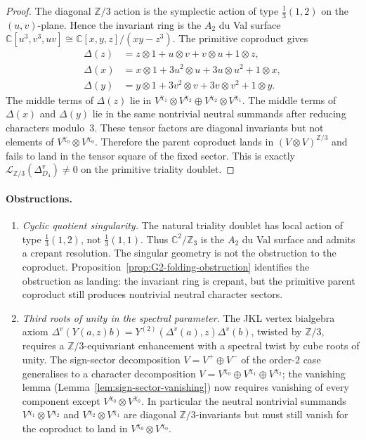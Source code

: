\documentclass[11pt]{amsart}
\theoremstyle{definition}
\theoremstyle{remark}
\begin{document}
\begin{proof}
The diagonal $\mathbb Z/3$ action is the symplectic action of type
$\frac{1}{3}(1,2)$ on the $(u,v)$-plane. Hence the invariant ring is
the $A_2$ du Val surface
$\mathbb C[u^3,v^3,uv]\cong\mathbb C[x,y,z]/(xy-z^3)$.
The primitive coproduct gives
\[
\begin{aligned}
  \Delta(z)
    &= z\otimes 1+u\otimes v+v\otimes u+1\otimes z,\\
  \Delta(x)
    &= x\otimes 1+3u^2\otimes u+3u\otimes u^2+1\otimes x,\\
  \Delta(y)
    &= y\otimes 1+3v^2\otimes v+3v\otimes v^2+1\otimes y .
\end{aligned}
\]
The middle terms of $\Delta(z)$ lie in
$V^{\chi_1}\otimes V^{\chi_2}\oplus
V^{\chi_2}\otimes V^{\chi_1}$. The middle terms of
$\Delta(x)$ and $\Delta(y)$ lie in the same nontrivial neutral
summands after reducing characters modulo~$3$. These tensor factors
are diagonal invariants but not elements of
$V^{\chi_0}\otimes V^{\chi_0}$. Therefore the parent coproduct lands
in $(V\otimes V)^{\mathbb Z/3}$ and fails to land in the tensor square
of the fixed sector. This is exactly
$\mathcal L_{\mathbb Z/3}(\Delta^v_{D_4})\neq 0$ on the primitive
triality doublet.
\end{proof}

\paragraph{Obstructions.}
\begin{enumerate}[label=\textup{(O\arabic*)}]
\item \emph{Cyclic quotient singularity.}
  The natural triality doublet has local action of type
  $\frac{1}{3}(1,2)$, not $\frac{1}{3}(1,1)$. Thus
  $\mathbb{C}^2/\mathbb{Z}_3$ is the $A_2$ du Val surface and admits
  a crepant resolution. The singular geometry is not the obstruction
  to the coproduct. Proposition~\ref{prop:G2-folding-obstruction}
  identifies the obstruction as landing: the invariant ring is
  crepant, but the primitive parent coproduct still produces
  nontrivial neutral character sectors.
\item \emph{Third roots of unity in the spectral parameter.}
  The JKL vertex bialgebra axiom $\Delta^v(Y(a, z)b) = Y^{(2)}(\Delta^v(a),
  z)\Delta^v(b)$, twisted by $\mathbb{Z}/3$, requires a
  $\mathbb{Z}/3$-equivariant enhancement with a spectral twist by
  cube roots of unity. The sign-sector decomposition
  $V = V^+ \oplus V^-$ of the order-$2$ case generalises to a
  character decomposition $V = V^{\chi_0} \oplus V^{\chi_1} \oplus V^{\chi_2}$;
  the vanishing lemma
  (Lemma~\ref{lem:sign-sector-vanishing}) now requires vanishing of
  every component except $V^{\chi_0}\otimes V^{\chi_0}$. In
  particular the neutral nontrivial summands
  $V^{\chi_1}\otimes V^{\chi_2}$ and
  $V^{\chi_2}\otimes V^{\chi_1}$ are diagonal
  $\mathbb{Z}/3$-invariants but must still vanish for the coproduct to
  land in $V^{\chi_0}\otimes V^{\chi_0}$.
\end{enumerate}
\end{document}

